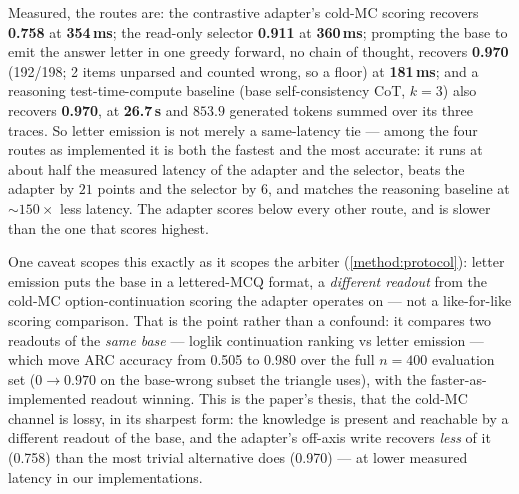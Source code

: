 Measured, the routes are: the contrastive adapter's cold-MC scoring recovers
\textbf{0.758} at \textbf{354\,ms}; the read-only selector \textbf{0.911} at
\textbf{360\,ms}; prompting the base to emit the answer letter in one greedy forward,
no chain of thought, recovers \textbf{0.970} (192/198; 2 items unparsed and counted
wrong, so a floor) at \textbf{181\,ms}; and a reasoning test-time-compute baseline
(base self-consistency CoT, $k{=}3$) also recovers \textbf{0.970}, at
\textbf{26.7\,s} and $853.9$ generated tokens summed over its three traces. So letter
emission is not merely a same-latency tie --- among the four routes as implemented it
is both the fastest and the most accurate: it runs at about half the measured latency
of the adapter and the selector, beats the adapter by $21$ points and the selector by
$6$, and matches the reasoning baseline at ${\sim}150\times$ less latency. The adapter
scores below every other route, and is slower than the one that scores highest.

One caveat scopes this exactly as it scopes the arbiter (\cref{method:protocol}):
letter emission puts the base in a lettered-MCQ format, a \emph{different readout}
from the cold-MC option-continuation scoring the adapter operates on --- not a
like-for-like scoring comparison. That is the point rather than a confound: it
compares two readouts of the \emph{same base} --- loglik continuation ranking vs
letter emission --- which move ARC accuracy from 0.505 to 0.980 over the full
$n{=}400$ evaluation set
($0{\rightarrow}0.970$ on the base-wrong subset the triangle uses), with the
faster-as-implemented readout winning. This is the paper's thesis, that the cold-MC
channel is lossy, in its sharpest form: the knowledge is present and reachable by a
different readout of the base, and the adapter's off-axis write recovers \emph{less}
of it (0.758) than the most trivial alternative does (0.970) --- at lower measured
latency in our implementations.

